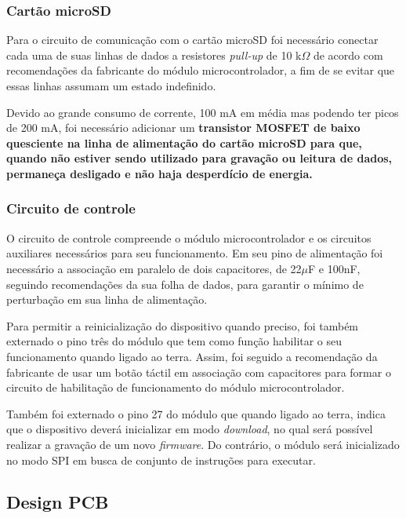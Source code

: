 \subsubsection{Cartão microSD}

Para o circuito de comunicação com o cartão microSD foi necessário conectar cada uma de suas linhas de dados a resistores \textit{pull-up} de 10 k$\Omega$ de acordo com recomendações da fabricante do módulo microcontrolador, a fim de se evitar que essas linhas assumam um estado indefinido. 

Devido ao grande consumo de corrente, 100 mA em média mas podendo ter picos de 200 mA, foi necessário adicionar um \textbf{transistor MOSFET de baixo quesciente na linha de alimentação do cartão microSD para que, quando não estiver sendo utilizado para gravação ou leitura de dados, permaneça desligado e não haja desperdício de energia.}

\subsubsection{Circuito de controle}


O circuito de controle compreende o módulo microcontrolador e os circuitos auxiliares necessários para seu funcionamento. Em seu pino de alimentação foi necessário a associação em paralelo de dois capacitores, de 22$\mu$F e 100nF, seguindo recomendações da sua folha de dados, para garantir o mínimo de perturbação em sua linha de alimentação. 

Para permitir a reinicialização do dispositivo quando preciso, foi também externado o pino três do módulo que tem como função habilitar o seu funcionamento quando ligado ao terra. Assim, foi seguido a recomendação da fabricante de usar um botão táctil em associação com capacitores para formar o circuito de habilitação de funcionamento do módulo microcontrolador.

Também foi externado o pino 27 do módulo que quando ligado ao terra, indica que o dispositivo deverá inicializar em modo \textit{download}, no qual será possível realizar a gravação de um novo \textit{firmware}. Do contrário, o módulo será inicializado no modo SPI em busca de conjunto de instruções para executar. 

\subsection{Design PCB}




